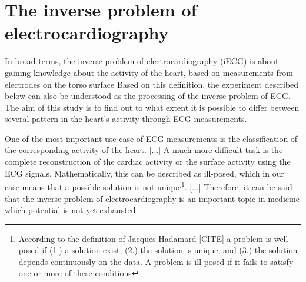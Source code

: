 \chapter{The inverse problem of electrocardiography}

In broad terms, the inverse problem of electrocardiography (iECG) is about gaining knowledge about the activity of the heart, based on measurements from electrodes on the torso surface \cite[p.300]{iECG} Based on this definition, the experiment described below can also be understood as the processing of the inverse problem of ECG. The aim of this study is to find out to what extent it is possible to differ between several pattern in the heart's activity through ECG measurements. 

One of the most important use case of ECG measurements is the classification of the corresponding activity of the heart. [...]
A much more difficult task is the complete reconstruction of the cardiac activity or the surface activity using the ECG signals. Mathematically, this can be described as ill-posed, which in our case means that a possible solution is not unique\footnote{According to the definition of Jacques Hadamard [CITE] a problem is well-posed if (1.) a solution exist, (2.) the solution is unique, and (3.) the solution depends continuously on the data. A problem is ill-posed if it fails to satisfy one or more of these conditions}.
[...]
Therefore, it can be said that the inverse problem of electrocardiography is an important topic in medicine which potential is not yet exhausted.


